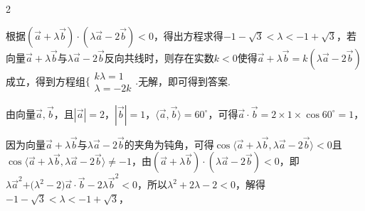 \begin{multicols}{2}




\bindp [分析]根据\(( \overrightarrow{a} + \lambda\overrightarrow{b} ) \cdot ( \lambda\overrightarrow{a} - 2\overrightarrow{b} ) < 0\)，得出方程求得\(- 1 - \sqrt{3} < \lambda < - 1 + \sqrt{3}\)，若向量\(\overrightarrow{a} + \lambda\overrightarrow{b}\)与\(\lambda\overrightarrow{a} - 2\overrightarrow{b}\)反向共线时，则存在实数\(k < 0\)使得\(\overrightarrow{a} + \lambda\overrightarrow{b} = k(\lambda\overrightarrow{a} - 2\overrightarrow{b})\)成立，得到方程组\(\Bigg\{ \begin{array}{r}
k\lambda = 1 \\
\lambda = - 2k
\end{array} \Bigg.\)无解，即可得到答案.

\bindp [详解]由向量\(\overrightarrow{a},\overrightarrow{b}\)，且\(| \overrightarrow{a} | = 2\)，\(| \overrightarrow{b} | = 1\)，\(\langle \overrightarrow{a},\overrightarrow{b} \rangle = 60^{\circ}\)，可得\(\overrightarrow{a} \cdot \overrightarrow{b} = 2 \times 1 \times \cos 60^{\circ} = 1\)，

\bindp 因为向量\(\overrightarrow{a} + \lambda\overrightarrow{b}\)与\(\lambda\overrightarrow{a} - 2\overrightarrow{b}\)的夹角为钝角，可得\(\cos\langle \overrightarrow{a} + \lambda\overrightarrow{b},\lambda\overrightarrow{a} - 2\overrightarrow{b} \rangle < 0\)且\(\cos\langle \overrightarrow{a} + \lambda\overrightarrow{b},\lambda\overrightarrow{a} - 2\overrightarrow{b} \rangle \neq - 1\)，由\(( \overrightarrow{a} + \lambda\overrightarrow{b} ) \cdot ( \lambda\overrightarrow{a} - 2\overrightarrow{b} ) < 0\)，即\(\lambda{\overrightarrow{a}}^{2}\text{+(}\lambda^{2} - 2)\overrightarrow{a} \cdot \overrightarrow{b} - 2\lambda{\overrightarrow{b}}^{2} < 0\)，所以\(\lambda^{2} + 2\lambda - 2 < 0\)，解得\(- 1 - \sqrt{3} < \lambda < - 1 + \sqrt{3}\)，


\end{multicols}
